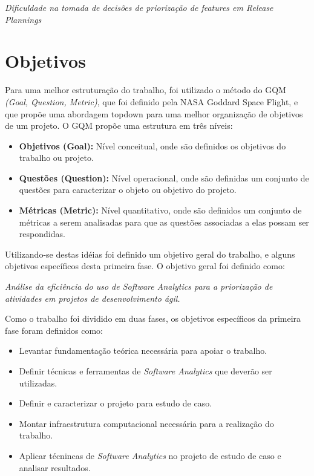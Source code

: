 \begin{center}
 \textit{Dificuldade na tomada de decisões de priorização de features em 
  Release Plannings}
\end{center}

\section{Objetivos}

Para uma melhor estruturação do trabalho, foi utilizado o método do
GQM \textit{(Goal, Question, Metric)}, que foi definido pela NASA Goddard Space 
Flight, e que propõe uma abordagem topdown para uma melhor organização de objetivos
de um projeto. O GQM propõe uma estrutura em três níveis\cite{gqm}:

\begin{itemize}
    \item \textbf{Objetivos (Goal):} Nível conceitual, onde são definidos os 
        objetivos do trabalho ou projeto.
    \item \textbf{Questões (Question):} Nível operacional, onde são definidas um 
        conjunto de questões para caracterizar o objeto ou objetivo do projeto.
    \item \textbf{Métricas (Metric):} Nível quantitativo, onde são definidos um
        conjunto de métricas a serem analisadas para que as questões associadas
        a elas possam ser respondidas.
\end{itemize}

Utilizando-se destas idéias foi definido um objetivo geral do trabalho, e alguns
objetivos específicos desta primeira fase. O objetivo geral foi definido como: 

\begin{center}
    \textit{Análise da eficiência do uso de Software Analytics para a priorização 
        de atividades em projetos de desenvolvimento ágil.}
\end{center}

Como o trabalho foi dividido em duas fases, os objetivos específicos da primeira 
fase foram definidos como:

\begin{itemize}
    \item Levantar fundamentação teórica necessária para apoiar o trabalho.
    \item Definir técnicas e ferramentas de \textit{Software Analytics} que deverão ser utilizadas.
    \item Definir e caracterizar o projeto para estudo de caso.
    \item Montar infraestrutura computacional necessária para a realização do trabalho.
    \item Aplicar técnincas de \textit{Software Analytics} no projeto de estudo de caso e analisar resultados.
\end{itemize}

